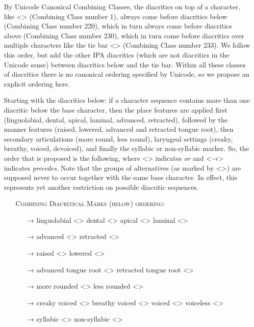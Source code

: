 By Unicode Canonical Combining Classes, the diacritics on top of a character,
like <> (Combining Class number 1), always come before diacritics
below (Combining Class number 220), which in turn always come before diacritics
above (Combining Class number 230), which in turn come before diacritics over
multiple characters like the tie bar <>
(Combining Class number 233). We follow this order, but add the other IPA
diacritics (which are not diacritics in the Unicode sense) between diacritics
below and the tie bar. Within all these classes of diacritics there is no canonical
ordering specified by Unicode, so we propose an explicit ordering here.

Starting with the diacritics below: if a character sequence contains more than
one diacritic below the base character, then the place features are applied
first (linguolabial, dental, apical, laminal, advanced, retracted), followed by
the manner features (raised, lowered, advanced and retracted tongue root), then
secondary articulations (more round, less round), laryngeal settings (creaky,
breathy, voiced, devoiced), and finally the syllabic or non-syllabic marker. So,
the order that is proposed is the following, where <\textbar{}> indicates
\textit{or} and <→> indicates \textit{precedes}. Note that the groups of
alternatives (as marked by <\textbar{}>) are supposed never to occur together
with the same base character. In effect, this represents yet another restriction
on possible diacritic sequences.

\begin{itemize}
	\item[] \textsc{Combining Diacritical Marks (below) ordering:}
	\begin{itemize}	
	  \item[→] linguolabial <> \textbar{} dental <> \textbar{} apical <> \textbar{} laminal <>
	  \item[→] advanced <> \textbar{} retracted <> 
	  \item[→] raised <> \textbar{} lowered <>
	  \item[→] advanced tongue root <> \textbar{} retracted tongue root <>
	  \item[→] more rounded <> \textbar{} less rounded <>
	  \item[→] creaky voiced <> \textbar{} breathy voiced <> \textbar{} voiced <> \textbar{} voiceless <>
	  \item[→] syllabic <> \textbar{} non-syllabic <>
	\end{itemize}
 \end{itemize}

